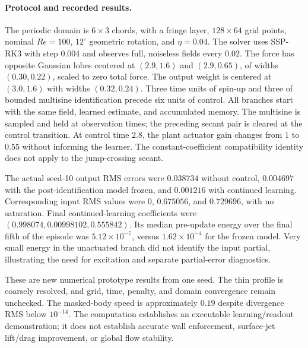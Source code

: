 \paragraph{Protocol and recorded results.}
The periodic domain is $6\times3$ chords, with a fringe layer, $128\times64$
grid points, nominal $Re=100$, $12^\circ$ geometric rotation, and
$\eta=0.04$. The solver uses SSP-RK3 with step $0.004$ and observes full,
noiseless fields every $0.02$. The force has opposite Gaussian lobes centered
at $(2.9,1.6)$ and $(2.9,0.65)$, of widths $(0.30,0.22)$, scaled to zero
total force. The output weight is centered at $(3.0,1.6)$ with widths
$(0.32,0.24)$. Three time units of spin-up and three of bounded multisine
identification precede six units of control. All branches start with the
same field, learned estimate, and accumulated memory. The multisine is
sampled and held at observation times; the preceding secant pair is cleared
at the control transition. At control time $2.8$, the plant actuator
gain changes from $1$ to $0.55$ without informing the learner. The
constant-coefficient compatibility identity does not apply to the
jump-crossing secant.

The actual seed-10 output RMS errors were $0.038734$ without control,
$0.004697$ with the post-identification model frozen, and $0.001216$ with
continued learning. Corresponding input RMS values were $0$, $0.675056$,
and $0.729696$, with no saturation. Final continued-learning coefficients
were $(0.998074,0.00998102,0.555842)$. Its median pre-update energy over the
final fifth of the episode was $5.12\times10^{-7}$, versus
$1.62\times10^{-4}$ for the frozen model. Very small energy in the
unactuated branch did not identify the input partial, illustrating the
need for excitation and separate partial-error diagnostics.

These are new numerical prototype results from one seed. The thin profile
is coarsely resolved, and grid, time, penalty, and domain convergence remain
unchecked. The masked-body speed is approximately $0.19$ despite divergence
RMS below $10^{-14}$. The computation establishes an executable
learning/readout demonstration; it does not establish accurate wall
enforcement, surface-jet lift/drag improvement, or global flow stability.
